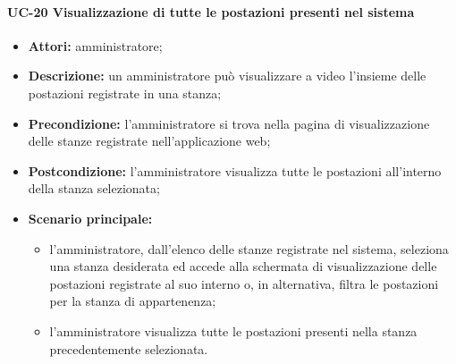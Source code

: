 \paragraph{UC-20 Visualizzazione di tutte le postazioni presenti nel sistema}
\begin{itemize}
    \item \textbf{Attori:} amministratore;
    \item \textbf{Descrizione:} un amministratore pu\`{o} visualizzare a video l'insieme delle postazioni registrate in una stanza;
    \item \textbf{Precondizione:} l'amministratore si trova nella pagina di visualizzazione delle stanze registrate nell'applicazione web;
    \item \textbf{Postcondizione:} l'amministratore visualizza tutte le postazioni all'interno della stanza selezionata;
    \item \textbf{Scenario principale:}
    \begin{itemize}
        \item l'amministratore, dall'elenco delle stanze registrate nel sistema, seleziona una stanza desiderata ed accede alla schermata di visualizzazione delle postazioni registrate al suo interno o, in alternativa, filtra le postazioni per la stanza di appartenenza;
        \item l'amministratore visualizza tutte le postazioni presenti nella stanza precedentemente selezionata.
    \end{itemize}
\end{itemize}

